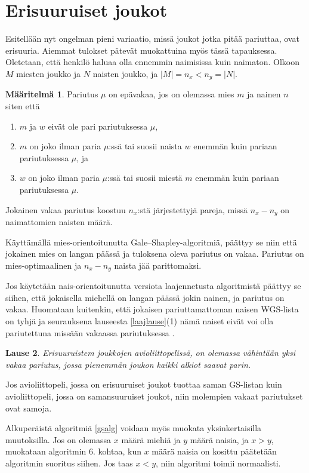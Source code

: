 \documentclass[finnish]{tktltiki2}
\newtheorem{lau}{Lause}
\theoremstyle{definition}
\newtheorem{maar}[lau]{Määritelmä}
\theoremstyle{remark}
\begin{document}
\section{Erisuuruiset joukot}
Esitellään nyt ongelman pieni variaatio, missä joukot jotka pitää pariuttaa, ovat erisuuria. Aiemmat tulokset pätevät muokattuina myös tässä tapauksessa. Oletetaan, että henkilö haluaa olla ennemmin naimisissa kuin naimaton.
Olkoon $M$ miesten joukko ja $N$ naisten joukko, ja $|M| = n_x < n_y = |N|$.

\begin{maar}
 Pariutus $\mu$ on epävakaa, jos on olemassa mies $m$ ja nainen $n$ siten että
\begin{enumerate}
	\item $m$ ja $w$ eivät ole pari pariutuksessa $\mu$,
	\item $m$ on joko ilman paria $\mu$:ssä tai suosii naista $w$ enemmän kuin pariaan pariutuksessa $\mu$, ja
	\item $w$ on joko ilman paria $\mu$:ssä tai suosii miestä $m$ enemmän kuin pariaan pariutuksessa $\mu$.
\end{enumerate}
\end{maar}

Jokainen vakaa pariutus koostuu $n_x$:stä järjestettyjä pareja, missä $n_x - n_y$ on naimattomien naisten määrä.

Käyttämällä mies-orientoitunutta Gale--Shapley-algoritmiä, päättyy  se niin että jokainen mies on langan päässä ja tuloksena oleva pariutus on vakaa. Pariutus on mies-optimaalinen ja $n_x - n_y$ naista jää parittomaksi.

Jos käytetään nais-orientoitunutta versiota laajennetusta algoritmistä päättyy se siihen, että jokaisella miehellä on langan päässä jokin nainen, ja pariutus on vakaa. Huomataan kuitenkin, että jokaisen pariuttamattoman naisen WGS-lista on tyhjä ja seurauksena lauseesta \ref{laajlause}(1) nämä naiset eivät voi olla pariutettuna missään vakaassa pariutuksessa \cite{gusfield1989stable}.

\begin{lau}
Erisuuruistem joukkojen avioliittopelissä, on olemassa vähintään yksi vakaa pariutus, jossa pienemmän joukon kaikki alkiot saavat parin.
\end{lau}
Jos avioliittopeli, jossa on erisuuruiset joukot tuottaa saman GS-listan kuin avioliittopeli, jossa on samansuuruiset joukot, niin molempien vakaat pariutukset ovat samoja.

Alkuperäistä algoritmiä \ref{gsalg} voidaan myös muokata yksinkertaisilla muutoksilla. Jos on olemassa $x$ määrä miehiä ja $y$ määrä naisia, ja $x > y$, muokataan algoritmin 6. kohtaa, kun $x$ määrä naisia on kosittu päätetään algoritmin suoritus siihen. Jos taas $x < y$, niin algoritmi toimii normaalisti.
\end{document}
